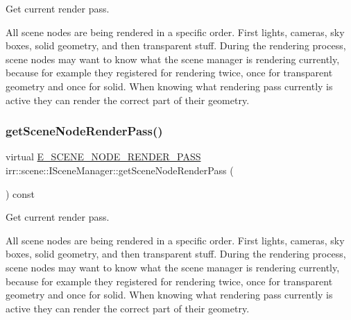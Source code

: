 Get current render pass. 

All scene nodes are being rendered in a specific order. First lights, cameras, sky boxes, solid geometry, and then transparent stuff. During the rendering process, scene nodes may want to know what the scene manager is rendering currently, because for example they registered for rendering twice, once for transparent geometry and once for solid. When knowing what rendering pass currently is active they can render the correct part of their geometry. \mbox{\label{classirr_1_1scene_1_1ISceneManager_a2b8f844a1367d80648bc055a5639807b}} 
\subsubsection{\texorpdfstring{get\+Scene\+Node\+Render\+Pass()}{getSceneNodeRenderPass()}\hspace{0.1cm}{\footnotesize\ttfamily [2/2]}}
{\footnotesize\ttfamily virtual \hyperlink{namespaceirr_1_1scene_a7862269bd1abc123929d4dbb8200d67f}{E\+\_\+\+S\+C\+E\+N\+E\+\_\+\+N\+O\+D\+E\+\_\+\+R\+E\+N\+D\+E\+R\+\_\+\+P\+A\+SS} irr\+::scene\+::\+I\+Scene\+Manager\+::get\+Scene\+Node\+Render\+Pass (\begin{DoxyParamCaption}{ }\end{DoxyParamCaption}) const\hspace{0.3cm}{\ttfamily [pure virtual]}}



Get current render pass. 

All scene nodes are being rendered in a specific order. First lights, cameras, sky boxes, solid geometry, and then transparent stuff. During the rendering process, scene nodes may want to know what the scene manager is rendering currently, because for example they registered for rendering twice, once for transparent geometry and once for solid. When knowing what rendering pass currently is active they can render the correct part of their geometry. \mbox{\label{classirr_1_1scene_1_1ISceneManager_aa920cb095fc901273fd097a39ebc3255}} 

